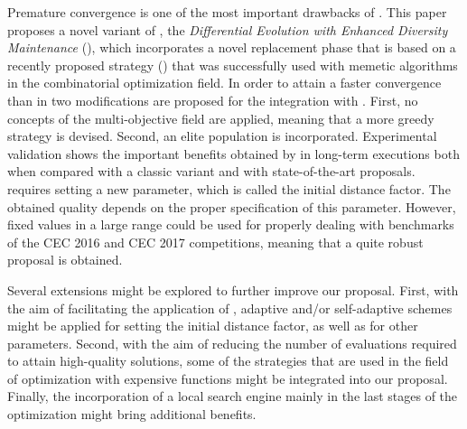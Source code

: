 Premature convergence is one of the most important drawbacks of \DE{}.
%
This paper proposes a novel variant of \DE{}, the \textit{Differential Evolution with Enhanced Diversity Maintenance} (\DEEDM{}),
which incorporates a novel replacement phase that is based on a recently proposed strategy (\RMDDC{}) that was successfully
used with memetic algorithms in the combinatorial optimization field.
%
In order to attain a faster convergence than in \RMDDC{} two modifications are proposed for the integration with \DE{}.
%
First, no concepts of the multi-objective field are applied, meaning that a more greedy strategy is devised.
%
Second, an elite population is incorporated.
%
Experimental validation shows the important benefits obtained by \DEEDM{} in long-term executions both when compared with a classic \DE{} variant and with
state-of-the-art proposals.
%
\DEEDM{} requires setting a new parameter, which is called the initial distance factor.
%
The obtained quality depends on the proper specification of this parameter.
%
However, fixed values in a large range could be used for properly dealing with benchmarks of the CEC 2016 and CEC 2017 competitions,
meaning that a quite robust proposal is obtained.

Several extensions might be explored to further improve our proposal.
%
First, with the aim of facilitating the application of \DEEDM{}, adaptive and/or self-adaptive schemes might be applied for setting the initial distance
factor, as well as for other \DE{} parameters.
%
Second, with the aim of reducing the number of evaluations required to attain high-quality solutions, some of the strategies that are used in the
field of optimization with expensive functions might be integrated into our proposal.
%
Finally, the incorporation of a local search engine mainly in the last stages of the optimization might bring additional benefits.
